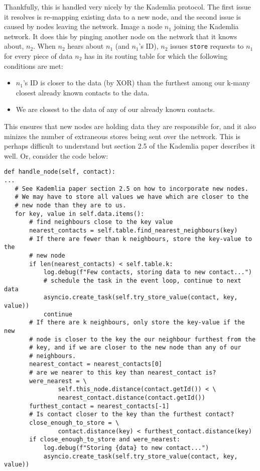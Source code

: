 \documentclass[12pt]{report}
\newcommand{\code}[1]{\colorbox{codegray}{\texttt{#1}}}
\begin{document}
\begin{itemize}
            Thankfully, this is handled very nicely by the Kademlia protocol.
            The first issue it resolves is re-mapping existing data to a new
            node, and the second issue is caused by nodes leaving the network.
            Image a node $n_1$ joining the Kademlia network.  It does this by
            pinging another node on the network that it knows about, $n_2$.
            When $n_2$ hears about $n_1$ (and $n_1$'s ID), $n_2$ issues
            \code{store} requests to $n_1$ for every piece of data $n_2$ has in
            its routing table for which the following conditions are met:
            \begin{itemize}
                \item $n_1$'s ID is closer to the data (by XOR) than the
                    furthest among our k-many closest already known contacts to
                    the data.
                \item We are closest to the data of any of our already known
                    contacts.
            \end{itemize}
            This ensures that new nodes are holding data they are responsible
            for, and it also minizes the number of extraneous stores being sent
            over the network.  This is perhaps difficult to understand but
            section 2.5 of the Kademlia paper describes it well.  Or, consider
            the code below:
\begin{lstlisting}[caption={Protocol.handle\_node()}, label=handle_node]
def handle_node(self, contact):
...
   # See Kademlia paper section 2.5 on how to incorporate new nodes.
   # We may have to store all values we have which are closer to the
   # new node than they are to us.
   for key, value in self.data.items():
       # find neighbours close to the key value
       nearest_contacts = self.table.find_nearest_neighbours(key)
       # If there are fewer than k neighbours, store the key-value to the
       # new node
       if len(nearest_contacts) < self.table.k:
           log.debug(f"Few contacts, storing data to new contact...")
           # schedule the task in the event loop, continue to next data
           asyncio.create_task(self.try_store_value(contact, key, value))
           continue
       # If there are k neighbours, only store the key-value if the new
       # node is closer to the key the our neighbour furthest from the
       # key, and if we are closer to the new node than any of our
       # neighbours.
       nearest_contact = nearest_contacts[0]
       # are we nearer to this key than nearest_contact is?
       were_nearest = \
               self.this_node.distance(contact.getId()) < \
               nearest_contact.distance(contact.getId())
       furthest_contact = nearest_contacts[-1]
       # Is contact closer to the key than the furthest contact?
       close_enough_to_store = \
               contact.distance(key) < furthest_contact.distance(key) 
       if close_enough_to_store and were_nearest:
           log.debug(f"Storing {data} to new contact...")
           asyncio.create_task(self.try_store_value(contact, key, value))


\end{lstlisting}
\end{itemize}
\end{document}

